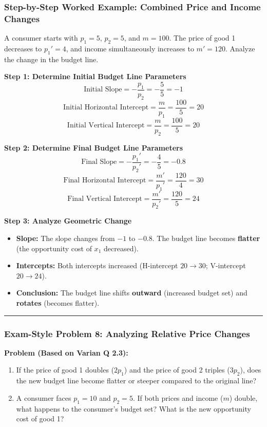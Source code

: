 \documentclass{article}
\begin{document}
\subsubsection*{Step-by-Step Worked Example: Combined Price and Income Changes}

A consumer starts with $p_1=5$, $p_2=5$, and $m=100$. The price of good 1 decreases to $p_1'=4$, and income simultaneously increases to $m'=120$. Analyze the change in the budget line.

\textbf{Step 1: Determine Initial Budget Line Parameters} \[ \text{Initial Slope} = -\frac{p_1}{p_2} = -\frac{5}{5} = -1 \] \[ \text{Initial Horizontal Intercept} = \frac{m}{p_1} = \frac{100}{5} = 20 \] \[ \text{Initial Vertical Intercept} = \frac{m}{p_2} = \frac{100}{5} = 20 \]

\textbf{Step 2: Determine Final Budget Line Parameters} \[ \text{Final Slope} = -\frac{p_1'}{p_2'} = -\frac{4}{5} = -0.8 \] \[ \text{Final Horizontal Intercept} = \frac{m'}{p_1'} = \frac{120}{4} = 30 \] \[ \text{Final Vertical Intercept} = \frac{m'}{p_2'} = \frac{120}{5} = 24 \]

\textbf{Step 3: Analyze Geometric Change}
\begin{itemize}
    \item \textbf{Slope:} The slope changes from $-1$ to $-0.8$. The budget line becomes \textbf{flatter} (the opportunity cost of $x_1$ decreased).
    \item \textbf{Intercepts:} Both intercepts increased (H-intercept $20 \to 30$; V-intercept $20 \to 24$).
    \item \textbf{Conclusion:} The budget line shifts \textbf{outward} (increased budget set) and \textbf{rotates} (becomes flatter).
\end{itemize}
\noindent\rule{\linewidth}{0.4pt}

\subsubsection*{Exam-Style Problem 8: Analyzing Relative Price Changes}

\textbf{Problem (Based on Varian Q 2.3):}
\begin{enumerate}
    \item If the price of good 1 doubles ($2p_1$) and the price of good 2 triples ($3p_2$), does the new budget line become flatter or steeper compared to the original line?
    \item A consumer faces $p_1=10$ and $p_2=5$. If both prices and income ($m$) double, what happens to the consumer's budget set? What is the new opportunity cost of good 1?
\end{enumerate}
\end{document}
